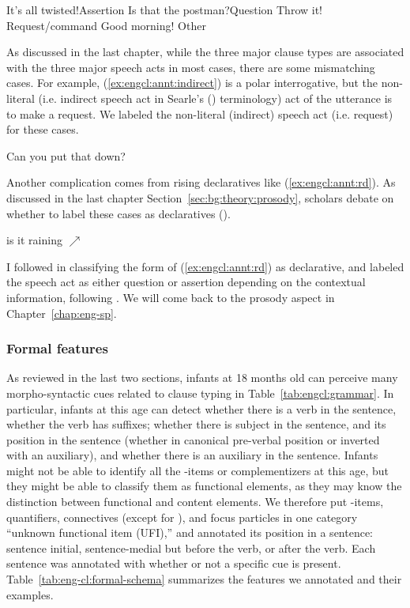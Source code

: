 \bxl\label{ex:engcl:annt:sp:a} It’s all twisted!\hfill	Assertion
\ex\label{ex:engcl:annt:sp:q} Is that the postman?\hfill		Question
\ex\label{ex:engcl:annt:sp:r} Throw it!	\hfill		Request/command
\ex \label{ex:engcl:annt:sp:o} Good morning! \hfill Other
\exl
\eex

As discussed in the last chapter, while the three major clause types are associated with the three major speech acts in most cases, there are some mismatching cases. For example, (\ref{ex:engcl:annt:indirect}) is a polar interrogative, but the non-literal (i.e. indirect speech act in Searle's (\cite*{searle1975indirect}) terminology) act of the utterance is to make a request. We labeled the non-literal (indirect) speech act (i.e. request) for these cases.

Can you put that down?
\eex 

Another complication comes from rising declaratives like (\ref{ex:engcl:annt:rd}). As discussed in the last chapter Section~\ref{sec:bg:theory:prosody}, scholars debate on whether to label these cases as declaratives (\cite{gunlogson2008,  farkasroelofsen2017}). 

is it raining $\nearrow$
\eex

I followed \textcite{gunlogson2008} in classifying the form of (\ref{ex:engcl:annt:rd}) as declarative, and labeled the speech act as either question or assertion depending on the contextual information, following \textcite{jeong2018, goodhue2021rd}. We will come back to the prosody aspect in Chapter~\ref{chap:eng-sp}.

\subsubsection{Formal features}

As reviewed in the last two sections, infants at 18 months old can perceive many morpho-syntactic cues related to clause typing in Table~\ref{tab:engcl:grammar}. In particular, infants at this age can detect whether there is a verb in the sentence, whether the verb has suffixes; whether there is subject in the sentence, and its position in the sentence (whether in canonical pre-verbal position or inverted with an auxiliary), and whether there is an auxiliary in the sentence. Infants might not be able to identify all the \twh-items or complementizers at this age, but they might be able to classify them as functional elements, as they may know the distinction between functional and content elements. We therefore put \twh-items, quantifiers, connectives (except for ), and focus particles in one category ``unknown functional item (UFI),'' and annotated its position in a sentence: sentence initial, sentence-medial but before the verb, or after the verb. Each sentence was annotated with whether or not a specific cue is present. Table~\ref{tab:eng-cl:formal-schema} summarizes the features we annotated and their examples.  



